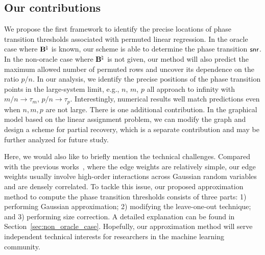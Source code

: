 \documentclass[11pt]{article}
\begin{document}
\subsection{Our contributions}
We propose the first framework to identify
the precise locations of phase transition thresholds
associated with permuted linear regression.
In the oracle case where $\mathbf{B}^{\natural}$ is known, our scheme
is able to determine the phase transition $\mathsf{snr}$. In the non-oracle case where
$\mathbf{B}^{\natural}$ is not given, our method will also predict
the maximum allowed number of permuted rows and uncover its dependence on the ratio $p/n$.   In our analysis, we
identify the precise positions of the phase transition points in the large-system limit, e.g.,
$n$, $m$, $p$ all approach to infinity with
$m/n\rightarrow \tau_m$, $p/n\rightarrow\tau_p$. Interestingly, numerical results well
match predictions  even when $n, m, p$
are not large. There is one additional contribution. In the graphical model based on the linear assignment problem, we can modify the graph and design a scheme for partial recovery, which is a separate contribution and may be further analyzed for future study.




Here, we  would also like to briefly mention the technical challenges.
Compared with the previous works~\citep{mezard1986mean, mezard1987solution, parisi2002finite, linusson2004proof, mezard2009information, talagrand2010mean,   semerjian2020recovery},
where the edge weights are relatively simple,
our edge weights usually involve
high-order interactions across
Gaussian random variables and are densely
correlated.
To tackle this issue, our proposed approximation method
to compute the phase transition thresholds
consists of three parts: 1) performing Gaussian approximation;   2) modifying the leave-one-out technique;
and 3) performing size correction. A detailed
explanation can be found in Section~\ref{sec:non_oracle_case}. Hopefully, our approximation method
will serve independent technical interests for researchers in the machine learning community.
\end{document}

